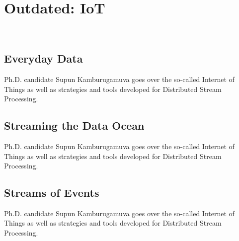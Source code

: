 


\chapter{Outdated: IoT}
\label{sec:icloud-iot}

\FILENAME\


\section{Everyday Data}

Ph.D. candidate Supun Kamburugamuva goes over the so-called Internet of
Things as well as strategies and tools developed for Distributed Stream
Processing.




\section{Streaming the Data Ocean}

Ph.D. candidate Supun Kamburugamuva goes over the so-called Internet of
Things as well as strategies and tools developed for Distributed Stream
Processing.



\section{Streams of Events}

Ph.D. candidate Supun Kamburugamuva goes over the so-called Internet of
Things as well as strategies and tools developed for Distributed Stream
Processing.


